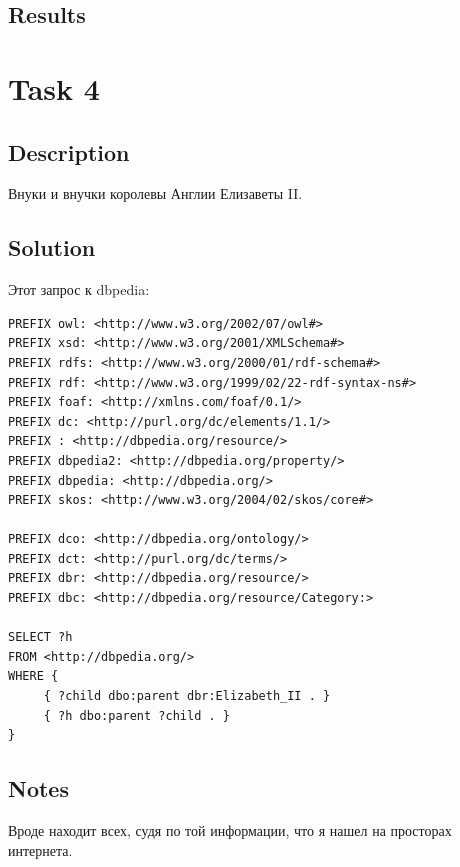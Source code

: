 \documentclass{article}
\begin{document}
\subsection*{Results}

\noindent{}

\section*{Task 4}

\subsection*{Description}

Внуки и внучки королевы Англии Елизаветы II.
\subsection*{Solution}

Этот запрос к dbpedia:

\begin{verbatim}
PREFIX owl: <http://www.w3.org/2002/07/owl#>
PREFIX xsd: <http://www.w3.org/2001/XMLSchema#>
PREFIX rdfs: <http://www.w3.org/2000/01/rdf-schema#>
PREFIX rdf: <http://www.w3.org/1999/02/22-rdf-syntax-ns#>
PREFIX foaf: <http://xmlns.com/foaf/0.1/>
PREFIX dc: <http://purl.org/dc/elements/1.1/>
PREFIX : <http://dbpedia.org/resource/>
PREFIX dbpedia2: <http://dbpedia.org/property/>
PREFIX dbpedia: <http://dbpedia.org/>
PREFIX skos: <http://www.w3.org/2004/02/skos/core#>

PREFIX dco: <http://dbpedia.org/ontology/>
PREFIX dct: <http://purl.org/dc/terms/>
PREFIX dbr: <http://dbpedia.org/resource/>
PREFIX dbc: <http://dbpedia.org/resource/Category:>

SELECT ?h
FROM <http://dbpedia.org/>
WHERE {
     { ?child dbo:parent dbr:Elizabeth_II . }
     { ?h dbo:parent ?child . }
}
\end{verbatim}
\subsection*{Notes}
Вроде находит всех, судя по той информации, что я нашел на просторах интернета.
\end{document}
